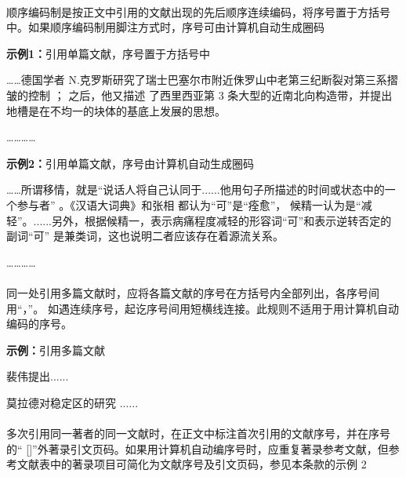 \documentclass[twoside]{article}%
\begin{document}
\paragraph{} 顺序编码制是按正文中引用的文献出现的先后顺序连续编码，将序号置于方括号中。如果顺序编码制用脚注方式时，序号可由计算机自动生成圈码

\begin{refsection}
\textbf{示例1：}引用单篇文献，序号置于方括号中

……德国学者 N.克罗斯研究了瑞士巴塞尔市附近侏罗山中老第三纪断裂对第三系摺皱的控制
\cite{Sunstein1996-903-903}； 之后，他又描述
了西里西亚第 3 条大型的近南北向构造带，并提出地槽是在不均一的块体的基底上发展的思想\cite{Morri2010--}。

…………

\textbf{示例2：}引用单篇文献，序号由计算机自动生成圈码

……所谓移情，就是“说话人将自己认同于......他用句子所描述的时间或状态中的一个参与者”
。《汉语大词典》和张相
都认为“可”是“痊愈”，
候精一认为是“减轻”。......另外，根据候精一，表示病痛程度减轻的形容词“可”和表示逆转否定的副词“可”
是兼类词，这也说明二者应该存在着源流关系。

…………
\end{refsection}

\paragraph{} 同一处引用多篇文献时，应将各篇文献的序号在方括号内全部列出，各序号间用“，”。
如遇连续序号，起讫序号间用短横线连接。此规则不适用于用计算机自动编码的序号。

\begin{refsection}
\textbf{示例：}引用多篇文献

裴伟提出\cite{Humphrey1971--,KENNEDY1975-311-386}......

莫拉德对稳定区的研究
\cite{CRANE1972--,Weinstein1974-745-772,KENNEDY1975-311-386}......


\end{refsection}


\paragraph{}\label{sec:numeric:multic} 多次引用同一著者的同一文献时，在正文中标注首次引用的文献序号，并在序号的“ []”外著录引文页码。如果用计算机自动编序号时，应重复著录参考文献，但参考文献表中的著录项目可简化为文献序号及引文页码，参见本条款的示例 2
\end{document}

